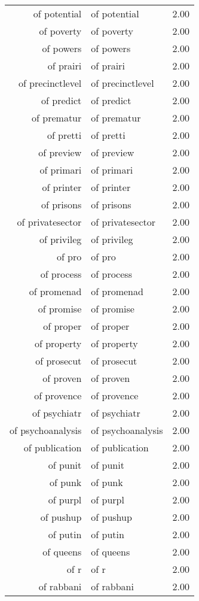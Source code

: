 \begin{table}[ht]
\begin{tabular}{rlr}
  of potential & of potential & 2.00 \\ 
  of poverty & of poverty & 2.00 \\ 
  of powers & of powers & 2.00 \\ 
  of prairi & of prairi & 2.00 \\ 
  of precinctlevel & of precinctlevel & 2.00 \\ 
  of predict & of predict & 2.00 \\ 
  of prematur & of prematur & 2.00 \\ 
  of pretti & of pretti & 2.00 \\ 
  of preview & of preview & 2.00 \\ 
  of primari & of primari & 2.00 \\ 
  of printer & of printer & 2.00 \\ 
  of prisons & of prisons & 2.00 \\ 
  of privatesector & of privatesector & 2.00 \\ 
  of privileg & of privileg & 2.00 \\ 
  of pro & of pro & 2.00 \\ 
  of process & of process & 2.00 \\ 
  of promenad & of promenad & 2.00 \\ 
  of promise & of promise & 2.00 \\ 
  of proper & of proper & 2.00 \\ 
  of property & of property & 2.00 \\ 
  of prosecut & of prosecut & 2.00 \\ 
  of proven & of proven & 2.00 \\ 
  of provence & of provence & 2.00 \\ 
  of psychiatr & of psychiatr & 2.00 \\ 
  of psychoanalysis & of psychoanalysis & 2.00 \\ 
  of publication & of publication & 2.00 \\ 
  of punit & of punit & 2.00 \\ 
  of punk & of punk & 2.00 \\ 
  of purpl & of purpl & 2.00 \\ 
  of pushup & of pushup & 2.00 \\ 
  of putin & of putin & 2.00 \\ 
  of queens & of queens & 2.00 \\ 
  of r & of r & 2.00 \\ 
  of rabbani & of rabbani & 2.00 \\ 

\end{tabular}
\end{table}
